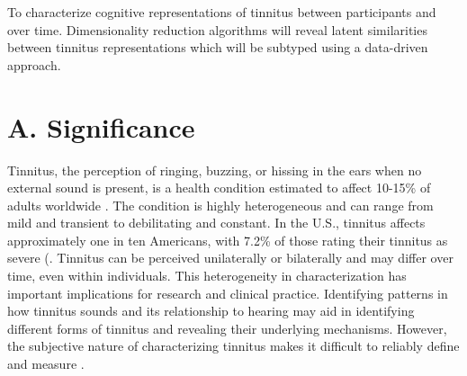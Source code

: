 \documentclass[11pt, notitlepage]{article} %
\begin{document}
To characterize cognitive representations of tinnitus between participants and over time.
Dimensionality reduction algorithms will reveal latent similarities between
tinnitus representations which will be subtyped using a data-driven approach.



\newpage

\section*{A. Significance}

Tinnitus, the perception of ringing, buzzing, or hissing in the ears when no external sound is present,
is a health condition estimated to affect 10-15\% of adults worldwide \cite{henryTinnitusEpidemiologicPerspective2020}.
The condition is highly heterogeneous and can range from mild and transient to debilitating and constant.
In the U.S., tinnitus affects approximately one in ten Americans, with 7.2\% of those rating their tinnitus as severe (\cite{bhattPrevalenceSeverityExposures2016}.
Tinnitus can be perceived unilaterally or bilaterally and may differ over time, even within individuals.
This heterogeneity in characterization has important implications for research
and clinical practice.
Identifying patterns in how tinnitus sounds and its relationship to hearing may aid in identifying
different forms of tinnitus and revealing their underlying mechanisms.
However, the subjective nature of characterizing tinnitus makes it difficult
to reliably define and measure \cite{vajsakovicPrinciplesMethodsPsychoacoustic2021}.
\end{document}
